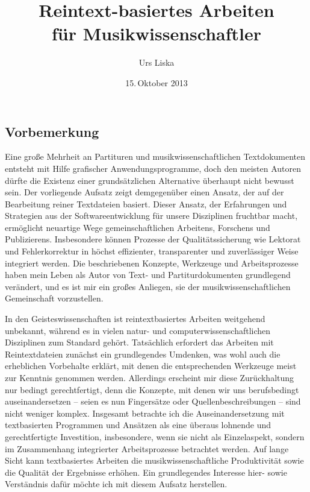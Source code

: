 \documentclass[DIV=12]{scrreprt}
\begin{document}
\title{Reintext-basiertes Arbeiten\\für Musikwissenschaftler}
\author{Urs Liska}
\date{15.\,Oktober 2013}
\maketitle

\subsection*{Vorbemerkung}
Eine große Mehrheit an Partituren und musikwissenschaftlichen Textdokumenten entsteht mit Hilfe grafischer Anwendungsprogramme, doch den meisten Autoren dürfte die Existenz einer grundsätzlichen Alternative überhaupt nicht bewusst sein.
Der vorliegende Aufsatz zeigt demgegenüber einen Ansatz, der auf der Bearbeitung reiner Textdateien basiert.
Dieser Ansatz, der Erfahrungen und Strategien aus der Softwareentwicklung für unsere Disziplinen fruchtbar macht, ermöglicht neuartige Wege gemeinschaftlichen Arbeitens, Forschens und Publizierens.
Insbesondere können Prozesse der Qualitätssicherung wie Lektorat und Fehlerkorrektur in höchst effizienter, transparenter und zuverlässiger Weise integriert werden.
Die beschriebenen Konzepte, Werkzeuge und Arbeitsprozesse haben mein Leben als Autor von Text- und Partiturdokumenten grundlegend verändert, und es ist mir ein großes Anliegen, sie der musikwissenschaftlichen Gemeinschaft vorzustellen.

In den Geisteswissenschaften ist reintextbasiertes Arbeiten weitgehend unbekannt, während es in vielen natur- und computerwissenschaftlichen Disziplinen zum Standard gehört.
Tatsächlich erfordert das Arbeiten mit Reintextdateien zunächst ein grundlegendes Umdenken, was wohl auch die erheblichen Vorbehalte erklärt, mit denen die entsprechenden Werkzeuge meist zur Kenntnis genommen werden.
Allerdings erscheint mir diese Zurückhaltung nur bedingt gerechtfertigt, denn die Konzepte, mit denen wir uns berufsbedingt auseinandersetzen -- seien es nun Fingersätze oder Quellenbeschreibungen -- sind nicht weniger komplex.
Insgesamt betrachte ich die Auseinandersetzung mit textbasierten Programmen und Ansätzen als eine überaus lohnende und gerechtfertigte Investition, insbesondere, wenn sie nicht als Einzelaspekt, sondern im Zusammenhang integrierter Arbeitsprozesse betrachtet werden.
Auf lange Sicht kann textbasiertes Arbeiten die musikwissenschaftliche Produktivität sowie die Qualität der Ergebnisse erhöhen.
Ein grundlegendes Interesse hier- sowie Verständnis dafür möchte ich mit diesem Aufsatz herstellen.
\end{document}
